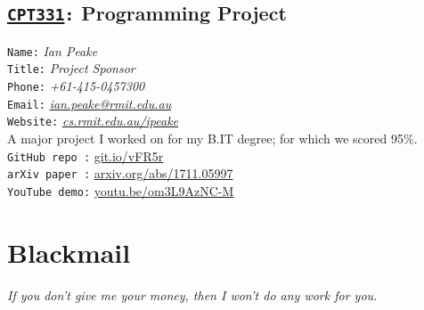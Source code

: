 \documentclass[12pt,a4paper,oneside]{article}
\newcommand{\textapprox}{\raisebox{0.5ex}{\texttildelow}}
\begin{document}
\subsection{\texttt{\href{https://www.open.edu.au/courses/it/rmit-university-programming-project--cpt331-2017}{CPT331}:} Programming Project}
\texttt{Name\phantom{...}:} \textit{\color{s}Ian Peake}
\\\texttt{Title\phantom{..}:} \textit{\color{s}Project Sponsor}
\\\texttt{Phone\phantom{..}:} \textit{\color{s}+61-415-0457300}
\\\texttt{Email\phantom{..}:} \textit{\color{s}\href{mailto:ian.peake@rmit.edu.au?Subject=Shyam}{ian.peake@rmit.edu.au}}
\\\texttt{Website:} \textit{\color{s}\href{http://www.cs.rmit.edu.au/~ipeake/}{cs.rmit.edu.au/\textapprox{}ipeake}}
\medskip{}\\A major project I worked on for my B.IT degree; for which we scored 95\%.
\\\texttt{GitHub repo :} \href{https://github.com/Pretty-Cure-5/Euclidian}{git.io/vFR5r}
\\\texttt{arXiv paper :} \href{https://arxiv.org/abs/1711.05997}{arxiv.org/abs/1711.05997}
\\\texttt{YouTube demo:} \href{https://www.youtube.com/watch?v=om3L9AzNC-M}{youtu.be/om3L9AzNC-M}

%
%
%

\phantom{menace}
\vfill
\section{Blackmail}
\textit{If you don't give me your money, then I won't do any work for you.}
\end{document}
